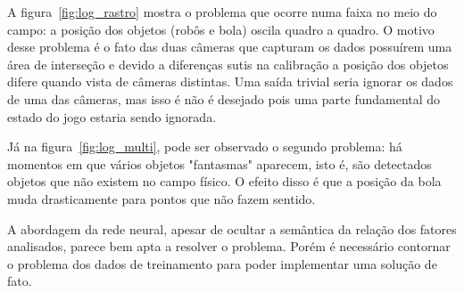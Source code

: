 A figura~\ref{fig:log_rastro} mostra o problema que ocorre numa faixa no meio do
campo: a posição dos objetos (robôs e bola) oscila quadro a quadro. O motivo
desse problema é o fato das duas câmeras que capturam os dados possuírem uma
área de interseção e devido a diferenças sutis na calibração a posição dos
objetos difere quando vista de câmeras distintas. Uma saída trivial seria
ignorar os dados de uma das câmeras, mas isso é não é desejado pois uma parte
fundamental do estado do jogo estaria sendo ignorada.

Já na figura~\ref{fig:log_multi}, pode ser observado o segundo problema: há
momentos em que vários objetos "fantasmas" aparecem, isto é, são detectados
objetos que não existem no campo físico. O efeito disso é que a posição da bola
muda drasticamente para pontos que não fazem sentido.

A abordagem da rede neural, apesar de ocultar a semântica da relação dos fatores
analisados, parece bem apta a resolver o problema. Porém é necessário contornar
o problema dos dados de treinamento para poder implementar uma solução de fato.

